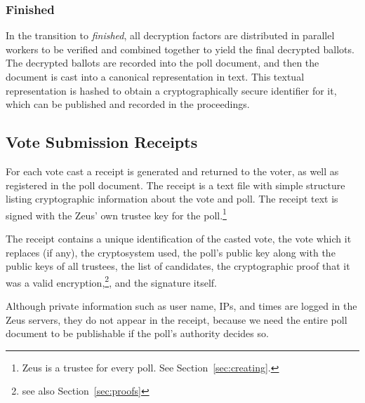 \documentclass[letterpaper,10pt]{article}
\begin{document}
\subsubsection{Finished}
\label{sec:finished}
In the transition to \emph{finished}, all decryption factors are
distributed in parallel workers to be verified and combined together
to yield the final decrypted ballots.
The decrypted ballots are recorded into the poll document,
and then the document is cast into a canonical representation in text.
This textual representation is hashed to obtain a cryptographically
secure identifier for it, which can be published and recorded
in the proceedings.

\subsection{Vote Submission Receipts}
\label{sec:receipts}
For each vote cast a receipt is generated and returned to the voter,
as well as registered in the poll document.
The receipt is a text file with simple structure listing cryptographic
information about the vote and poll.
The receipt text is signed with the Zeus' own trustee key for the
poll.\footnote{
Zeus is a trustee for every poll. See Section~\ref{sec:creating}.}

The receipt contains a unique identification of the casted vote,
the vote which it replaces (if any), the cryptosystem used,
the poll's public key along with the public keys of all trustees,
the list of candidates, the cryptographic proof that it was a valid
encryption,\footnote{see also Section~\ref{sec:proofs}},
and the signature itself.

Although private information such as user name, IPs, and times
are logged in the Zeus servers, they do not appear in the receipt,
because we need the entire poll document to be publishable if
the poll's authority decides so.
\end{document}
